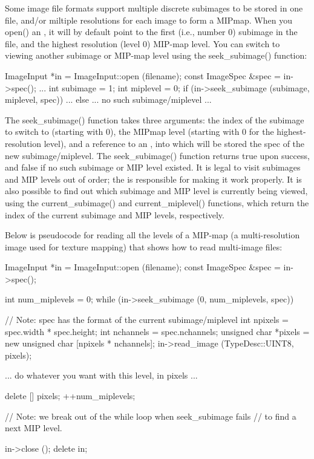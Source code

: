 Some image file formats support multiple discrete subimages to be stored
in one file, and/or miltiple resolutions for each image to form a
MIPmap.  When you {\cf open()} an \ImageInput, it will by default point
to the first (i.e., number 0) subimage in the file, and the highest
resolution (level 0) MIP-map level.  You can switch to viewing another
subimage or MIP-map level using the {\cf seek_subimage()} function:

\begin{code}
        ImageInput *in = ImageInput::open (filename);
        const ImageSpec &spec = in->spec();
        ...
        int subimage = 1;
        int miplevel = 0;
        if (in->seek_subimage (subimage, miplevel, spec)) {
            ...
        } else {
            ... no such subimage/miplevel ...
        }
\end{code}

The {\cf seek_subimage()} function takes three arguments: the index of
the subimage to switch to (starting with 0), the MIPmap level (starting
with 0 for the highest-resolution level), and a reference to an
\ImageSpec, into which will be stored the spec of the new
subimage/miplevel.  The {\cf seek_subimage()} function returns {\cf
  true} upon success, and {\cf false} if no such subimage or MIP level
existed.  It is legal to visit subimages and MIP levels out of order;
the \ImageInput is responsible for making it work properly.  It is also
possible to find out which subimage and MIP level is currently being
viewed, using the {\cf current_subimage()} and {\cf current_miplevel()}
functions, which return the index of the current subimage and MIP
levels, respectively.

Below is pseudocode for reading all the levels of a MIP-map (a
multi-resolution image used for texture mapping) that shows how to read
multi-image files:

\begin{code}
        ImageInput *in = ImageInput::open (filename);
        const ImageSpec &spec = in->spec();

        int num_miplevels = 0;
        while (in->seek_subimage (0, num_miplevels, spec)) {
            // Note: spec has the format of the current subimage/miplevel
            int npixels = spec.width * spec.height;
            int nchannels = spec.nchannels;
            unsigned char *pixels = new unsigned char [npixels * nchannels];
            in->read_image (TypeDesc::UINT8, pixels);

            ... do whatever you want with this level, in pixels ...

            delete [] pixels;
            ++num_miplevels;
        }
        // Note: we break out of the while loop when seek_subimage fails
        // to find a next MIP level.

        in->close ();
        delete in;
\end{code}

